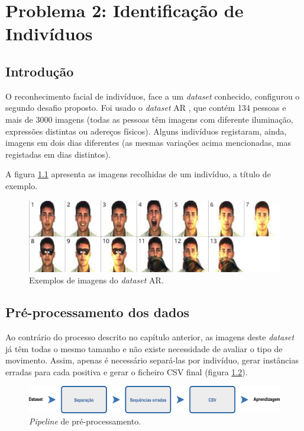 \chapter{Problema 2: Identificação de Indivíduos}
\label{chap:ident_individuos}

\section{Introdução}
\label{chap4:sec:intro}
O reconhecimento facial de indivíduos, face a um \textit{dataset} conhecido, configurou o segundo desafio proposto. Foi usado o \textit{dataset} AR \cite{ar_site}, que contém 134 pessoas e mais de 3000 imagens (todas as pessoas têm imagens com diferente iluminação, expressões distintas ou adereços físicos). Alguns indivíduos registaram, ainda, imagens em dois dias diferentes (as mesmas variações acima mencionadas, mas registadas em dias distintos).


\noindent A figura \ref{fig:ar_dataset} apresenta as imagens recolhidas de um indivíduo, a título de exemplo.

\begin{figure}[h]
\centering
\includegraphics[width=380pt]{ar_dataset.png}
\caption{Exemplos de imagens do \textit{dataset} AR.}
\label{fig:ar_dataset}
\end{figure}
\newline
\noindent
\newline
\noindent
\newline
\noindent
\section{Pré-processamento dos dados}
\label{chap3:sec:metodo}
Ao contrário do processo descrito no capítulo anterior, as imagens deste \textit{dataset} já têm todas o mesmo tamanho e não existe necessidade de avaliar o tipo de movimento. Assim, apenas é necessário separá-las por indivíduo, gerar instâncias erradas para cada positiva e gerar o ficheiro CSV final (figura \ref{fig:processo2}).

\begin{figure}[h]
\centering
\includegraphics[width=380pt]{pipeline2.png}
\caption{\textit{Pipeline} de pré-processamento.}
\label{fig:processo2}
\end{figure}

